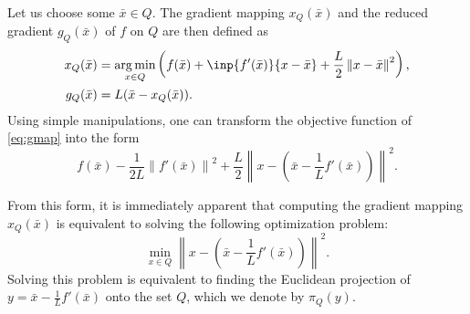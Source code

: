 \documentclass[final]{aomart}
\newtheorem[{}\it]{thm}{Theorem}[section]
\theoremstyle{definition}
\newtheorem*[{}\it]{notation}{Notation}
\numberwithin{equation}{section}
\newcommand{\enVert}[1]{\left\lVert#1\right\rVert}
\let\norm=\enVert
\newcommand{\xbar}{\bar{x}}
\DeclareMathOperator*{\argmin}{arg\,min}
\newcommand{\gmap}{x_Q(\xbar)}
\newcommand{\rg}{g_Q(\xbar)}
\newcommand{\proj}{\pi_Q(y)}
\begin{document}
Let us choose some \(\xbar \in Q\).
The gradient mapping \(\gmap\) and the reduced gradient \(\rg\) of \(f\) on \(Q\) are then defined as
\begin{align}
\label{eq:gmap}
\gmap &= \argmin_{x \in Q} \left( f(\xbar) + \inp{f'(\xbar)}{x - \xbar} + \frac{L}{2} \norm{x - \xbar}^2 \right),\\
\rg &= L(\xbar - \gmap).
\end{align}
Using simple manipulations, one can transform the objective function of \eqref{eq:gmap} into the form
\begin{equation}
f(\xbar) - \frac{1}{2L} \norm{f'(\xbar)}^2 + \frac{L}{2} \norm{x - \left(\xbar - \frac{1}{L} f'(\xbar)\right)}^2.
\end{equation}

From this form, it is immediately apparent that computing the gradient mapping \(\gmap\) is equivalent to solving the following optimization problem:
\begin{equation}
\min_{x \in Q} \norm{x - \left(\xbar - \frac{1}{L} f'(\xbar)\right)}^2.
\end{equation}
Solving this problem is equivalent to finding the Euclidean projection of \(y = \xbar - \frac{1}{L} f'(\xbar)\) onto the set \(Q\), which we denote by \(\proj\).
\end{document}
